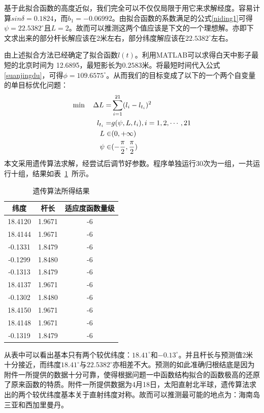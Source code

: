 \documentclass[12pt]{cumcmart}   %
\begin{document}
基于此拟合函数的高度近似，我们完全可以不仅仅局限于用它来求解经度。容易计算$sin \delta=0.1824$，而$b_1=-0.06992$。由拟合函数的系数满足的公式\ref{niding1}可得 $\psi=22.5382^\circ$且$L=2$。故而可以推测这两个值应该是下文的一个理想解。亦即下文求出来的部分杆长解应该在2米左右，部分纬度解应该在$22.5382^\circ$左右。

由上述拟合方法已经确定了拟合函数$l(t)$。利用MATLAB可以求得白天中影子最短的北京时间为 12.6895，最短影长为$0.2583$米。将最短时间代入公式\ref{suanjingdu}，可得$\phi=109.6575^\circ$。从而我们的目标变成了以下的一个两个自变量的单目标优化问题：
\begin{align}
\min \quad \Delta L = &\sum\limits_{i = 1}^{21} ({l_i}-l_{t_i})^2 \notag\\ 
l_{t_i}=&g(\psi,L,t_i),i=1,2,\cdots,21 \notag\\
L \in& (0, + \infty )\notag \\
\psi  \in& ( - \frac{\pi }{2},\frac{\pi }{2})  \notag
\end{align}
本文采用遗传算法求解，经尝试后调节好参数。程序单独运行30次为一组，一共运行十组，结果如表~\ref{answer1}~所示。

\begin{table}[!htbp]
	\centering
	\caption{遗传算法所得结果}\label{answer1}
	\begin{tabular}{ccc}
		\toprule[1.5pt]
		纬度& 杆长&适应度函数量级 \\
		\midrule[1pt]
	18.4120 &   1.9671 &   -6\\
	18.4144 &   1.9671  &  -6\\
	-0.1331  &  1.8479   & -6\\
	-0.1299  &  1.8480  &   -6\\
	-0.1313&    1.8479  &   -6\\
	18.4137  &  1.9671   &  -6\\
	-0.1302  &  1.8480  &   -6\\
	18.4150 &   1.9671   &  -6\\
	18.4148  &  1.9671   &  -6\\
	-0.1319  &  1.8479   &  -6\\
		\bottomrule[1.5pt]
	\end{tabular}
\end{table}

从表中可以看出基本只有两个较优纬度：$18.41^\circ$和$-0.13^\circ$。并且杆长与预测值2米十分接近，而纬度$18.41^\circ$与$22.5382^\circ$亦相差不大。预测的如此准确归根结底是因为附件一所提供的数据十分可靠，使得根据问题一中函数结构拟合的函数极高的还原了原来函数的特质。附件一所提供数据为4月18日，太阳直射北半球，遗传算法求出的两个较优纬度基本关于直射纬度对称。故而可以推测最可能的地点为：海南岛三亚和西加里曼丹。
\end{document}
